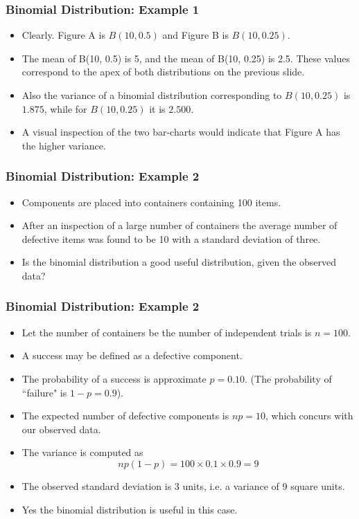 \begin{frame}
\frametitle{Binomial Distribution: Example 1}
\begin{itemize}
\item Clearly. Figure A is $B(10, 0.5)$ and Figure B is $B(10, 0.25)$.
\item The mean of B(10, 0.5) is 5, and the mean of B(10, 0.25) is 2.5. These values correspond to the apex of both distributions on the previous slide.
\item Also the variance of a binomial distribution corresponding to $B(10, 0.25)$ is $1.875$, while for $B(10, 0.25)$ it is $2.500$.
\item A visual inspection of the two bar-charts would indicate that Figure A has the higher variance.
\end{itemize}
\end{frame}
\begin{frame}
\frametitle{Binomial Distribution: Example 2}

\begin{itemize}
\item Components are placed into containers containing 100 items.
\item After an inspection of a large number of containers the average number of defective items was found to be 10 with a standard deviation of three.
\item Is the binomial distribution a good useful distribution, given the observed data?
\end{itemize}
\end{frame}
\begin{frame}
\frametitle{Binomial Distribution: Example 2}

\begin{itemize}
\item Let the number of containers be the number of independent trials is $n=100$.
\item A success may be defined as a defective component.
\item The probability of a success is approximate $p=0.10$. (The probability of ``failure" is $1-p=0.9$).
\item The expected number of defective components is $np=10$, which concurs with our observed data.
\item The variance is computed as \[np(1-p) = 100 \times 0.1 \times 0.9 = 9\]
\item The observed standard deviation is 3 units, i.e. a variance of 9 square units.
\item Yes the binomial distribution is useful in this case.
\end{itemize}
\end{frame}
